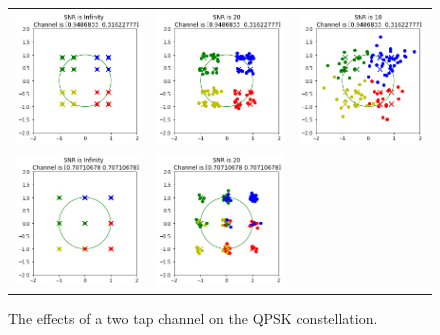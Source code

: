 \setlength{\tabcolsep}{0pt}
\begin{figure}
  \centering
  \label{fig:multi_tap}\caption{The effects of a two tap channel on the QPSK constellation.}
  \begin{tabular}{ccc}
    \includegraphics[width=45mm]{figures/equal_intro/snr_0_c3/cfo_0.png}&
    \includegraphics[width=45mm]{figures/equal_intro/snr_20_c3/cfo_0.png}&
    \includegraphics[width=45mm]{figures/equal_intro/snr_10_c3/cfo_0.png}\\
    \includegraphics[width=45mm]{figures/equal_intro/snr_0_c2/cfo_0.png}&
    \includegraphics[width=45mm]{figures/equal_intro/snr_20_c2/cfo_0.png}&

\end{tabular}
\end{figure}
